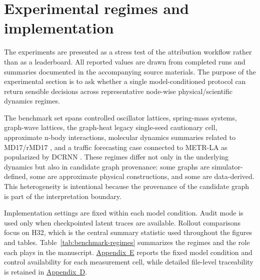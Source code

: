 \documentclass[preprint,12pt]{elsarticle}
\begin{document}
\FloatBarrier

\section{Experimental regimes and implementation}

The experiments are presented as a stress test of the attribution workflow rather than as a leaderboard. All reported values are drawn from completed runs and summaries documented in the accompanying source materials. The purpose of the experimental section is to ask whether a single model-conditioned protocol can return sensible decisions across representative node-wise physical/scientific dynamics regimes.

The benchmark set spans controlled oscillator lattices, spring-mass systems, graph-wave lattices, the graph-heat legacy single-seed cautionary cell, approximate n-body interactions, molecular dynamics summaries related to MD17/rMD17 \citep{chmiela2017gdml,christensen2020gradients}, and a traffic forecasting case connected to METR-LA as popularized by DCRNN \citep{li2018dcrnn}. These regimes differ not only in the underlying dynamics but also in candidate graph provenance: some graphs are simulator-defined, some are approximate physical constructions, and some are data-derived. This heterogeneity is intentional because the provenance of the candidate graph is part of the interpretation boundary.

Implementation settings are fixed within each model condition. Audit mode is used only when checkpointed latent traces are available. Rollout comparisons focus on H32, which is the central summary statistic used throughout the figures and tables. Table~\ref{tab:benchmark-regimes} summarizes the regimes and the role each plays in the manuscript. \hyperref[app:reproducibility]{Appendix~E} reports the fixed model condition and control availability for each measurement cell, while detailed file-level traceability is retained in \hyperref[app:traceability]{Appendix~D}.
\end{document}
